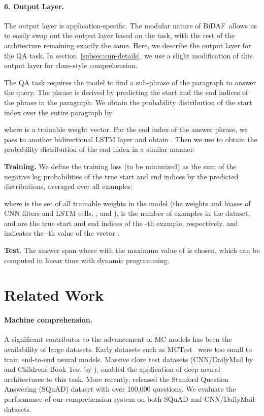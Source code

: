 \documentclass{article} \usepackage{iclr2017_conference,times}
\newcommand{\sysshort}{\mbox{\sc BiDAF}}
\begin{document}
\paragraph{6. Output Layer.}\label{subsec:out}
The output layer is application-specific. 
The modular nature of \sysshort\ allows us to easily swap out the output layer based on the task, with the rest of the architecture remaining exactly the same. Here, we describe the output layer for the QA task. In section~\ref{subsec:cnn-details}, we use a slight modification of this output layer for cloze-style comprehension.  

The QA task requires the model to find a sub-phrase of the paragraph to answer the query. The phrase is derived by predicting the start and the end indices of the phrase in the paragraph. We obtain the probability distribution of the start index over the entire paragraph by

where  is a trainable weight vector.
For the end index of the answer phrase, we pass  to another bidirectional LSTM layer and obtain .
Then we use  to obtain the probability distribution of the end index in a similar manner:


\textbf{Training.}
We define the training loss (to be minimized) as the sum of the negative log probabilities of the true start and end indices by the predicted distributions, averaged over all examples:

where  is the set of all trainable weights in the model (the weights and biases of CNN filters and LSTM cells, ,  and ),
 is the number of examples in the dataset,
 and  are the true start and end indices of the -th example, respectively,
and  indicates the -th value of the vector .

\textbf{Test.}
The answer span  where  with the maximum value of  is chosen, which can be computed in linear time with dynamic programming. 
\section{Related Work}\label{sec:related}
\paragraph{Machine comprehension.}
A significant contributor to the advancement of MC models has been the availability of large datasets. Early datasets such as MCTest~\citep{richardson2013mctest} were too small to train end-to-end neural models. 
Massive cloze test datasets (CNN/DailyMail by \citet{Hermann2015TeachingMT} and Childrens Book Test by \cite{hill2015goldilocks}), enabled the application of deep neural architectures to this task. 
More recently, \citet{rajpurkar2016squad} released the Stanford Question Answering (SQuAD) dataset with over 100,000 questions. We evaluate the performance of our comprehension system on both SQuAD and CNN/DailyMail datasets. 
\end{document}
